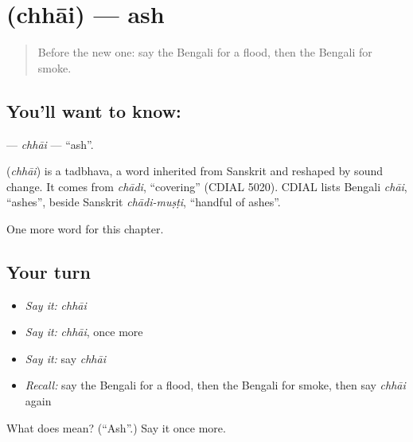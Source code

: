 \section[\texorpdfstring{\bn{ছাই} (chhāi)}{ছাই (chhāi)}]{ (chhāi) — ash}

\label{lesson:BN-C255-chhai}



\begin{quote}
Before the new one: say the Bengali for a flood, then the Bengali for smoke.
\end{quote}

\subsection*{You'll want to know: }
\textbf{} — \emph{chhāi} — \textquotedblleft{}ash\textquotedblright{}.

\begin{cousinweb}
\textbf{} (\emph{chhāi}) is a tadbhava, a word inherited from Sanskrit and reshaped by sound change. It comes from \emph{chādi}, \textquotedblleft{}covering\textquotedblright{} (CDIAL 5020). CDIAL lists Bengali \emph{chāi}, \textquotedblleft{}ashes\textquotedblright{}, beside Sanskrit \emph{chādi-muṣṭi}, \textquotedblleft{}handful of ashes\textquotedblright{}.
\end{cousinweb}

\begin{grammarlens}[title={What you've built}]
One more word for this chapter.
\end{grammarlens}

\subsection*{Your turn}
\begin{itemize}
\raggedright
  \item \emph{Say it:} \emph{chhāi}
  \item \emph{Say it:} \emph{chhāi}, once more
  \item \emph{Say it:} say \emph{chhāi}
  \item \emph{Recall:} say the Bengali for a flood, then the Bengali for smoke, then say \emph{chhāi} again
\end{itemize}

\begin{tcolorbox}[breakable,colback=teal!4,colframe=teal!35!black,title={Before you move on}]
What does  mean? (\textquotedblleft{}Ash\textquotedblright{}.) Say it once more.
\end{tcolorbox}
